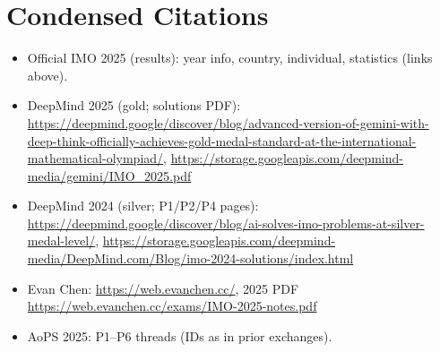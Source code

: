 \documentclass[11pt]{article}
\begin{document}
\section*{Condensed Citations}
\begin{itemize}[leftmargin=1.2em]
  \item Official IMO 2025 (results): year info, country, individual, statistics (links above).
  \item DeepMind 2025 (gold; solutions PDF): \url{https://deepmind.google/discover/blog/advanced-version-of-gemini-with-deep-think-officially-achieves-gold-medal-standard-at-the-international-mathematical-olympiad/}, \url{https://storage.googleapis.com/deepmind-media/gemini/IMO_2025.pdf}
  \item DeepMind 2024 (silver; P1/P2/P4 pages): \url{https://deepmind.google/discover/blog/ai-solves-imo-problems-at-silver-medal-level/}, \url{https://storage.googleapis.com/deepmind-media/DeepMind.com/Blog/imo-2024-solutions/index.html}
  \item Evan Chen: \url{https://web.evanchen.cc/}, 2025 PDF \url{https://web.evanchen.cc/exams/IMO-2025-notes.pdf}
  \item AoPS 2025: P1–P6 threads (IDs as in prior exchanges).
\end{itemize}
\end{document}
